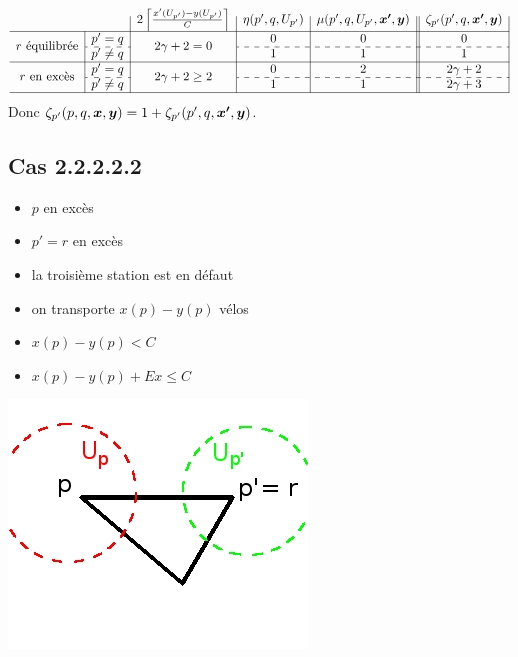 \documentclass[twoside,11pt,openany,a4paper]{rapport}
\begin{document}
\begin{gather*}
  \begin{array}{c|c|c|c|c||c|}
    \multicolumn{2}{c|}{}
    & 2 \left\lceil \frac{x'(U_{p'})-y(U_{p'})}{C} \right\rceil
    & \eta(p',q,U_{p'})
    & \mu(p',q,U_{p'},\bs{x'},\bs{y})
    & \zeta_{p'}(p',q,\bs{x'},\bs{y})
    \\ \hline
    \multirow{2}{*}{$r$ équilibrée}
    & p'=q
    & \multirow{2}{*}{$2\gamma+2=0$}
    & 0
    & 0
    & 0
    \\ \cdashline{2-2}\cdashline{4-6}
    & p' \ne q
    &
    & 1
    & 1
    & 1
    \\ \hline
    \multirow{2}{*}{$r$ en excès}
    & p'=q
    & \multirow{2}{*}{$2\gamma+2 \ge 2$}
    & 0
    & 2
    & 2\gamma+2
    \\ \cdashline{2-2}\cdashline{4-6}
    & p' \ne q
    &
    & 1
    & 1
    & 2\gamma+3
    \\ \hline
  \end{array}
\end{gather*}
Donc $\zeta_{p'}(p,q,\boldsymbol{x},\boldsymbol{y}) = 1 + \zeta_{p'}(p',q,\boldsymbol{x'},\boldsymbol{y})$.

\subsection*{Cas 2.2.2.2.2}

\begin{minipage}{0.5\linewidth}
\begin{itemize}
\item $p$ en excès
\item $p'=r$ en excès
\item la troisième station est en défaut
\item on transporte $x(p)-y(p)$ vélos
\item $x(p)-y(p) < C$
\item $x(p) - y(p) + Ex \le C$
\end{itemize}
\end{minipage}
\begin{minipage}{0.5\linewidth}
\begin{center}
\includegraphics[scale=0.5]{graphe_triangulaire_22222.jpg}
\end{center}
\end{minipage}
\end{document}
